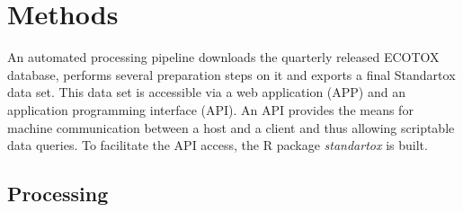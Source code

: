 \section{Methods}
An automated processing pipeline downloads the quarterly released ECOTOX database, performs several preparation steps on it and exports a final Standartox data set. This data set is accessible via a web application (APP) and an application programming interface (API). An API provides the means for machine communication between a host and a client and thus allowing scriptable data queries. To facilitate the API access, the R \citep{rcoreteam_language_2017} package \textit{standartox} is built.

\subsection{Processing}
